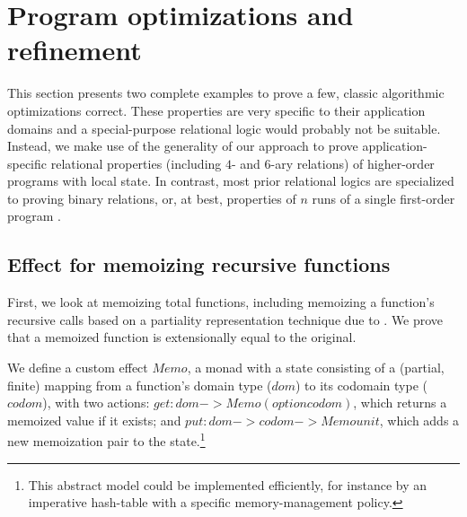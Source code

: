 \documentclass[sigplan,screen]{acmart}\settopmatter{}
\newcommand{\comm}[3]{\ifcheckpagebudget\else\ifdraft{\maybecolor{#1}[#2: #3]}\fi\fi}
\newcommand{\ch}[1]{\comm{teal}{CH}{#1}}
\begin{document}

\fi

\section{Program optimizations and refinement}
\label{sec:equiv}
\label{sec:refinement}

This section presents two complete examples to prove a few,
classic algorithmic optimizations correct. These properties are very
specific to their application domains and a special-purpose
relational logic would probably not be
suitable. Instead, we make use of the generality of our approach to
prove application-specific relational properties (including $4$- and
$6$-ary relations) of higher-order programs with local state.  In
contrast, most prior relational logics are specialized to proving
binary relations, or, at best, properties of $n$ runs of a single
first-order program \citep{SousaD16}.

\subsection{Effect for memoizing recursive functions}
\label{sec:memo}

First, we look at memoizing total functions,
including memoizing a function's recursive calls 
based on a partiality representation
technique due to \citet{McBride15}.
%
We prove that a memoized function is extensionally equal to the original.

We define a custom effect \ls$Memo$, a monad with a state consisting of a
(partial, finite) mapping from a function's domain type (\ls$dom$)
to its codomain type (\ls$codom$),
%
with two actions:
%
\ls$get : dom -> Memo (option codom)$, which returns a memoized value if it exists; and
\ls$put : dom -> codom -> Memo unit$, which adds a new memoization pair
  to the state.\footnote{
This abstract model could be implemented efficiently,
for instance by an imperative hash-table with a specific
memory-management policy.}
\end{document}
